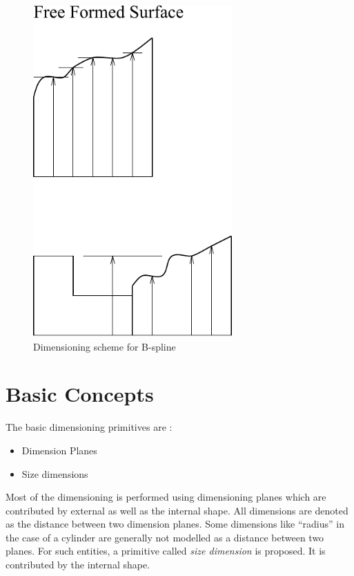 \begin{itemize}
        \begin{figure}[htbp]
                        \hspace{2cm}
            \includegraphics[width=3.0in,height=5.0in]{DIMBSP.pdf}

            \caption{Dimensioning scheme for B-spline}
            \label{dimbsp}
        \end{figure}

	\end{itemize}


	\section{Basic Concepts}

	The basic dimensioning primitives are :
		\begin{itemize}
		\item
		Dimension Planes
		\item
		Size dimensions
		\end{itemize}

	Most of the dimensioning is performed using dimensioning planes which are
	contributed
	by external as well as the internal shape. All dimensions are denoted
	as the distance between two dimension planes. Some dimensions
	like ``radius'' in the case of a cylinder are generally not modelled as 
	a distance
	between two planes. For such entities, a primitive called {\em size 
	dimension} is proposed. It is contributed by the internal shape.


